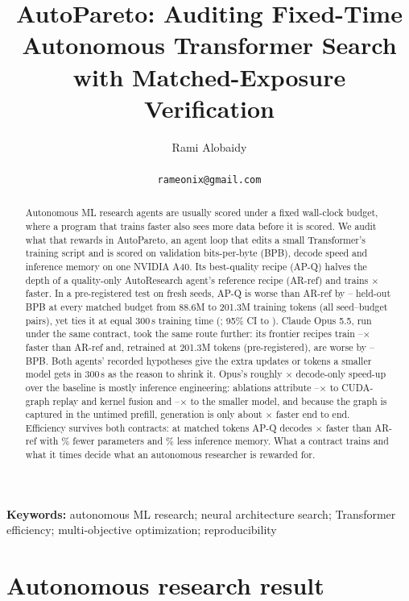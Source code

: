 \documentclass{article}
\title{AutoPareto: Auditing Fixed-Time Autonomous Transformer Search\\with Matched-Exposure Verification}
\author{Rami Alobaidy\\ \authortodo{affiliation: author to confirm}\\ \texttt{rameonix@gmail.com}}
\begin{document}
\maketitle
\begin{abstract}
Autonomous ML research agents are usually scored under a fixed wall-clock budget, where a program that trains faster also sees more data before it is scored.
We audit what that rewards in AutoPareto, an agent loop that edits a small Transformer's training script and is scored on validation bits-per-byte (BPB), decode speed and inference memory on one NVIDIA A40.
Its best-quality recipe (AP-Q) halves the depth of a quality-only AutoResearch agent's reference recipe (AR-ref) and trains \CREOneRho$\times$ faster.
In a pre-registered test on fresh seeds, AP-Q is worse than AR-ref by \CREOneMatchedLoAbs--\CREOneMatchedHiAbs{} held-out BPB at every matched budget from 88.6M to 201.3M training tokens (all \CREOnePairs{} seed--budget pairs), yet ties it at equal 300\,s training time (\CREOneTimeHeldThree; 95\% CI \CREOneTimeHeldLo{} to \CREOneTimeHeldHi).
Claude Opus 5.5, run under the same contract, took the same route further: its frontier recipes train \CRMTRhoLo--\CRMTRhoHi$\times$ faster than AR-ref and, retrained at 201.3M tokens (pre-registered), are worse by \CRMTDLoAbs--\CRMTDHiAbs{} BPB.
Both agents' recorded hypotheses give the extra updates or tokens a smaller model gets in 300\,s as the reason to shrink it.
Opus's roughly \CRIATotalMed$\times$ decode-only speed-up over the baseline is mostly inference engineering: ablations attribute \CRIAJointLo--\CRIAJointHi$\times$ to CUDA-graph replay and kernel fusion and \CRIAArchLo--\CRIAArchHi$\times$ to the smaller model, and because the graph is captured in the untimed prefill, generation is only about \CRIAEtoEMed$\times$ faster end to end.
Efficiency survives both contracts: at matched tokens AP-Q decodes \CRDecodeRatio$\times$ faster than AR-ref with \CRParamReduction\% fewer parameters and \CRMemoryReduction\% less inference memory.
What a contract trains and what it times decide what an autonomous researcher is rewarded for.
\end{abstract}

\noindent\textbf{Keywords:} autonomous ML research; neural architecture search; Transformer efficiency; multi-objective optimization; reproducibility

\section{Autonomous research result}\label{partone}
\end{document}
